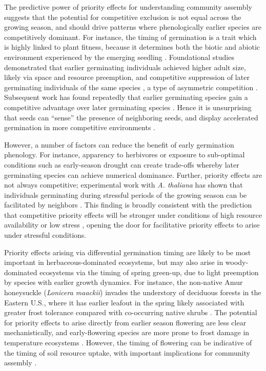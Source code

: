 \documentclass[11pt]{article}
\begin{document}
The predictive power of priority effects for understanding community assembly suggests that the potential for competitive exclusion is not equal across the growing season, and should drive patterns where phenologically earlier species are competitively dominant. For instance, the timing of germination is a trait which is highly linked to plant fitness, because it determines both the biotic and abiotic environment experienced by the emerging seedling \citep{donohue2010germination}. Foundational studies demonstrated that earlier germinating individuals achieved higher adult size, likely via space and resource preemption, and competitive suppression of later germinating individuals of the same species \citep{ross1972occupation},  a type of asymmetric competition \citep{connolly1996asymmetric}. Subsequent work has found repeatedly that earlier germinating species gain a competitive advantage over later germinating species \citep{cleland2015priority,waterton2016trade,blackford2020species}. Hence it is unsurprising that seeds can “sense” the presence of neighboring seeds, and display accelerated germination in more competitive environments \citep{dyer2000accelerated}.

However, a number of factors can reduce the benefit of early germination phenology. For instance, apparency to herbivores \citep{waterton2016trade} or exposure to sub-optimal conditions such as early-season drought \citep{wainwright2012seasonal} can create trade-offs whereby later germinating species can achieve numerical dominance. Further, priority effects are not always competitive; experimental work with \textit{A. thaliana} has shown that individuals germinating during stressful periods of the growing season can be facilitated by neighbors \citep{leverett2017germination}. This finding is broadly consistent with the prediction that competitive priority effects will be stronger under conditions of high resource availability or low stress \citep{vannette2014historical}, opening the door for facilitative priority effects to arise under stressful conditions.

Priority effects arising via differential germination timing are likely to be most important in herbaceous-dominated ecosystems, but may also arise in woody-dominated ecosystems via the timing of spring green-up, due to light preemption by species with earlier growth dynamics. For instance, the non-native Amur honeysuckle (\textit{Lonicera maackii}) invades the understory of deciduous forests in the Eastern U.S., where it has earlier leafout in the spring likely associated with greater frost tolerance compared with co-occurring native shrubs \citep{mcewan2009leaf}. The potential for priority effects to arise directly from earlier season flowering are less clear mechanistically, and early-flowering species are more prone to frost damage in temperature ecosystems \citep{inouye2008effects}. However, the timing of flowering can be indicative of the timing of soil resource uptake, with important implications for community assembly \citep{gulmon1983phenology,seabloom2003invasion}.
\end{document}
